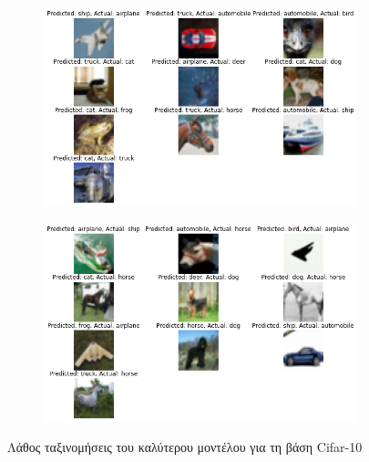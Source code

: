 \documentclass[a4paper]{article}
\begin{document}
\begin{figure}[H]
    \centering

    \begin{subfigure}[t]{0.48\linewidth}
    \includegraphics[width=\linewidth]{figures/cifar/wrong_results_1.png}
    \end{subfigure}
    \begin{subfigure}[t]{0.48\linewidth}
    \includegraphics[width=\linewidth]{figures/cifar/wrong_results_2.png}
    \end{subfigure}

    \caption{Λάθος ταξινομήσεις του καλύτερου μοντέλου για τη βάση Cifar-10}
    \label{fig:cifar_wrong}
\end{figure}
\end{document}

